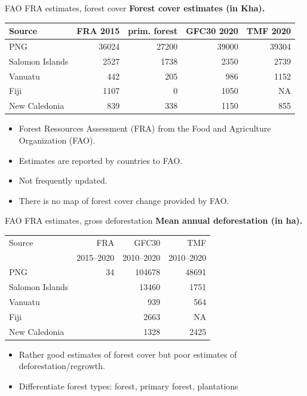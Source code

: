 \documentclass[10pt,table,dvipsnames,compress]{beamer}
\begin{document}
\begin{frame}[label={sec:org372d776}]{FAO FRA estimates, forest cover}
\textbf{Forest cover estimates (in Kha).}

\begin{center}
\begin{tabular}{lrrrr}
Source & FRA 2015 & prim. forest & GFC30 2020 & TMF 2020\\[0pt]
\hline
PNG & 36024 & 27200 & 39000 & 39304\\[0pt]
Salomon Islands & 2527 & 1738 & 2350 & 2739\\[0pt]
Vanuatu & 442 & 205 & 986 & 1152\\[0pt]
Fiji & 1107 & 0 & 1050 & NA\\[0pt]
New Caledonia & 839 & 338 & 1150 & 855\\[0pt]
\end{tabular}
\end{center}

\begin{itemize}
\item Forest Ressources Assessment (FRA) from the Food and Agriculture Organization (FAO).
\item Estimates are reported by countries to FAO.
\item Not frequently updated.
\item There is no map of forest cover change provided by FAO.
\end{itemize}
\end{frame}

\begin{frame}[label={sec:org41a3237}]{FAO FRA estimates, gross deforestation}
\textbf{Mean annual deforestation (in ha).}

\begin{center}
\begin{tabular}{lrrr}
Source & FRA & GFC30 & TMF\\[0pt]
 & 2015--2020 & 2010--2020 & 2010--2020\\[0pt]
\hline
PNG & 34 & 104678 & 48691\\[0pt]
Salomon Islands &  & 13460 & 1751\\[0pt]
Vanuatu &  & 939 & 564\\[0pt]
Fiji &  & 2663 & NA\\[0pt]
New Caledonia &  & 1328 & 2425\\[0pt]
\end{tabular}
\end{center}

\begin{itemize}
\item Rather good estimates of forest cover but poor estimates of deforestation/regrowth.
\item Differentiate forest types: forest, primary forest, plantations
\end{itemize}
\end{frame}
\end{document}
